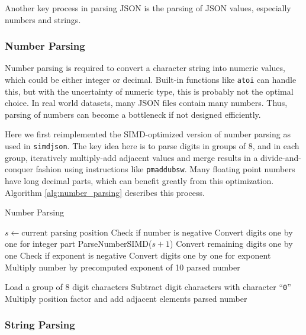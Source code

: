 \documentclass[11pt]{article}
\begin{document}
Another key process in parsing JSON is the parsing of JSON values, especially numbers and strings.

\subsubsection{Number Parsing}
Number parsing is required to convert a character string into numeric values, which could be either integer or decimal. Built-in functions like \texttt{atoi} can handle this, but with the uncertainty of numeric type, this is probably not the optimal choice. In real world datasets, many JSON files contain many numbers. Thus, parsing of numbers can become a bottleneck if not designed efficiently.

Here we first reimplemented the SIMD-optimized version of number parsing as used in \texttt{simdjson}. The key idea here is to parse digits in groups of 8, and in each group, iteratively multiply-add adjacent values and merge results in a divide-and-conquer fashion using instructions like \texttt{pmaddubsw}. Many floating point numbers have long decimal parts, which can benefit greatly from this optimization. Algorithm \ref{alg:number_parsing} describes this process.

\begin{algorithm}
\caption{Number Parsing}\label{alg:number_parsing}
\begin{algorithmic}[1]
\State $s\leftarrow\text{current parsing position}$
\State Check if number is negative
\State Convert digits one by one for integer part
        \State ParseNumberSIMD($s+1$)
    \EndIf
    \State Convert remaining digits one by one
\EndIf
{}
\State Check if exponent is negative
\State Convert digits one by one for exponent
\State Multiply number by precomputed exponent of 10
\EndIf
\State \Return parsed number
\EndProcedure

\State Load a group of 8 digit characters
\State Subtract digit characters with character ``\texttt{0}''
    \State Multiply position factor and add adjacent elements
\EndWhile
\State \Return parsed number
\EndProcedure
\end{algorithmic}
\end{algorithm}

\subsubsection{String Parsing}
\end{document}
